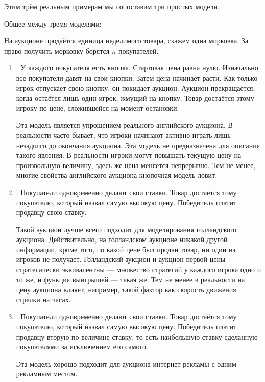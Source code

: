 \begin{itemize}
\end{itemize}

Этим трём реальным примерам мы сопоставим три простых модели.


Общее между тремя моделями:

На аукционе продаётся единица неделимого товара, скажем одна морковка. За право получить морковку борятся $ n $ покупателей.




\begin{enumerate}
\item {}. У каждого покупателя есть кнопка. Стартовая цена равна нулю. Изначально все покупатели давят на свои кнопки. Затем цена начинает расти. Как только игрок отпускает свою кнопку, он покидает аукцион. Аукцион прекращается, когда остаётся лишь один игрок, жмущий на кнопку. Товар достаётся этому игроку по цене, сложившейся на момент остановки.

Эта модель является упрощением реального английского аукциона. В реальности часто бывает, что игроки начинают активно играть лишь незадолго до окончания аукциона. Эта модель не предназначена для описания такого явления. В реальности игроки могут повышать текущую цену на произвольную величину, здесь же цена меняется непрерывно. Тем не менее, многие свойства английского аукциона кнопочная модель ловит.

\item {}. Покупатели одновременно делают свои ставки. Товар достаётся тому покупателю, который назвал самую высокую цену. Победитель платит продавцу свою ставку.

Такой аукцион лучше всего подходит для моделирования голландского аукциона. Действительно, на голландском аукционе никакой другой информации, кроме того, по какой цене был продан товар, ни один из игроков не получает. Голландский аукцион и аукцион первой цены стратегически эквивалентны — множество стратегий у каждого игрока одно и то же, и функция выигрышей — такая же. Тем не менее в реальности на цену аукциона влияет, например, такой фактор как скорость движения стрелки на часах.
\item {}. Покупатели одновременно делают свои ставки. Товар достаётся тому покупателю, который назвал самую высокую цену. Победитель платит продавцу вторую по величине ставку, то есть наибольшую ставку сделанную покупателями за исключением его самого.

Эта модель хорошо подходит для аукциона интернет-рекламы с одним рекламным местом.
\end{enumerate}

